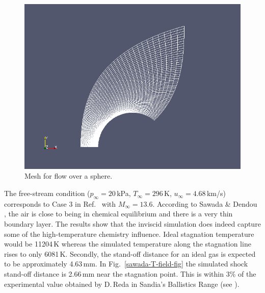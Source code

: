 \begin{figure}[htbp]
\begin{center}
\includegraphics[width=12cm]{../2D/sawada_sphere/ss3-mesh.png}
\end{center}
\caption{Mesh for flow over a sphere.}
\label{sawada-mesh-fig}
\end{figure}

\medskip
The free-stream condition ($p_{\infty} = 20$\,kPa, $T_{\infty} = 296$\,K,
$u_{\infty} = 4.68$\,km/s) corresponds to Case 3 in 
Ref.~\cite{sawada_dendou_2001a} with $M_{\infty} = 13.6$.
According to Sawada \& Dendou  \cite{sawada_dendou_2001a}, the air is close
to being in chemical equilibrium and there is a very thin boundary layer. 
The results show that the inviscid simulation does indeed capture some 
of the high-temperature chemistry influence.
Ideal stagnation temperature would be 11204\,K whereas the simulated
temperature along the stagnation line rises to only 6081\,K. 
Secondly, the stand-off distance for an ideal gas is expected to be
approximately 4.63\,mm.
In Fig.~\ref{sawada-T-field-fig} the simulated shock 
stand-off distance is 2.66\,mm near the stagnation point.
This is within 3\% of the experimental value obtained by D.\,Reda in
Sandia's Ballistics Range (see \cite{sawada_dendou_2001a}).

